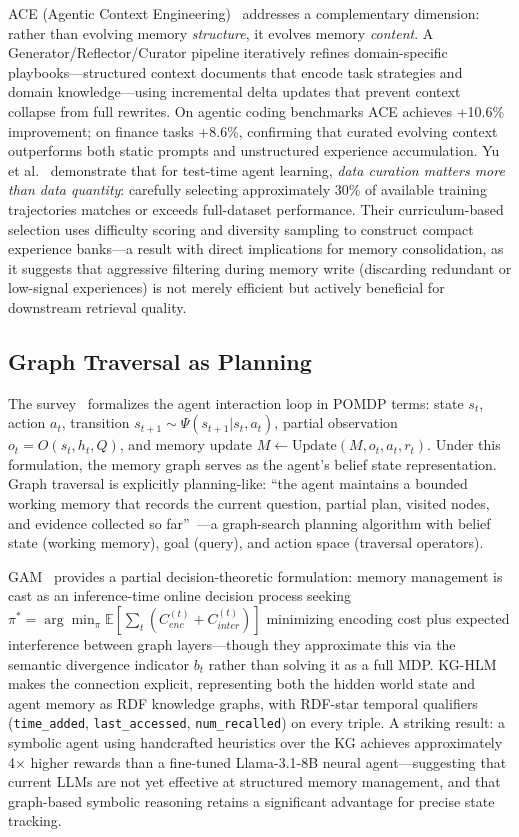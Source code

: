 \documentclass[hf]{ceurart}
\begin{document}
ACE (Agentic Context Engineering)~\cite{ace2026} addresses a
complementary dimension: rather than evolving memory \emph{structure},
it evolves memory \emph{content}. A Generator/Reflector/Curator
pipeline iteratively refines domain-specific playbooks---structured
context documents that encode task strategies and domain
knowledge---using incremental delta updates that prevent context
collapse from full rewrites. On agentic coding benchmarks ACE
achieves +10.6\% improvement; on finance tasks +8.6\%, confirming
that curated evolving context outperforms both static prompts and
unstructured experience accumulation.
Yu et al.~\cite{curriculum2026} demonstrate that for test-time agent
learning, \emph{data curation matters more than data quantity}:
carefully selecting approximately 30\% of available training
trajectories matches or exceeds full-dataset performance. Their
curriculum-based selection uses difficulty scoring and diversity
sampling to construct compact experience banks---a result with
direct implications for memory consolidation, as it suggests that
aggressive filtering during memory write (discarding redundant or
low-signal experiences) is not merely efficient but actively
beneficial for downstream retrieval quality.

\subsection{Graph Traversal as Planning}

The survey~\cite{graphmemsurvey2026} formalizes the agent interaction
loop in POMDP terms: state $s_t$, action $a_t$, transition
$s_{t+1} \sim \Psi(s_{t+1} | s_t, a_t)$, partial observation
$o_t = O(s_t, h_t, Q)$, and memory update
$M \leftarrow \text{Update}(M, o_t, a_t, r_t)$. Under this
formulation, the memory graph serves as the agent's belief state
representation. Graph traversal is explicitly planning-like: ``the
agent maintains a bounded working memory that records the current
question, partial plan, visited nodes, and evidence collected so
far''~\cite{graphmemsurvey2026}---a graph-search planning algorithm
with belief state (working memory), goal (query), and action space
(traversal operators).

GAM~\cite{gam2026} provides a partial decision-theoretic formulation:
memory management is cast as an inference-time online decision
process seeking $\pi^* = \arg\min_\pi \mathbb{E}[\sum_t
(C_{enc}^{(t)} + C_{inter}^{(t)})]$ minimizing encoding cost plus
expected interference between graph layers---though they approximate
this via the semantic divergence indicator $b_t$ rather than solving
it as a full MDP.
KG-HLM~\cite{kghlm2025} makes the connection explicit, representing
both the hidden world state and agent memory as RDF knowledge graphs,
with RDF-star temporal qualifiers (\texttt{time\_added},
\texttt{last\_accessed}, \texttt{num\_recalled}) on every triple.
A striking result: a symbolic agent using handcrafted heuristics over
the KG achieves approximately 4$\times$ higher rewards than a
fine-tuned Llama-3.1-8B neural agent---suggesting that current LLMs
are not yet effective at structured memory management, and that
graph-based symbolic reasoning retains a significant advantage for
precise state tracking.
\end{document}
